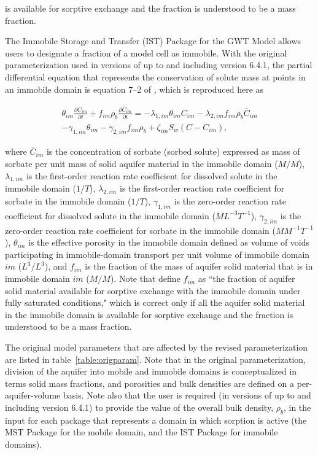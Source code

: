is available for sorptive exchange and the fraction is understood to be a mass fraction.

The Immobile Storage and Transfer (IST) Package for the GWT Model allows users to designate a fraction of a model cell as immobile. With the original parameterization used in versions of \mf up to and including version 6.4.1, the partial differential equation that represents the conservation of solute mass at points in an immobile domain is equation 7--2 of \cite{modflow6gwt}, which is reproduced here as 

\begin{equation}
\label{eqn:gwtistpdeorig}
\begin{split}
\theta_{im} \frac{\partial C_{im} }{\partial t} + f_{im} \rho_b \frac{\partial \overline{C}_{im}}{\partial t} = 
- \lambda_{1,im} \theta_{im} C_{im} - \lambda_{2,im}  f_{im} \rho_b \overline{C}_{im} \\
- \gamma_{1,im} \theta_{im} - \gamma_{2,im} f_{im}  \rho_b 
+ \zeta_{im} S_w \left ( C - C_{im} \right ),
\end{split}
\end{equation}

\noindent where $\overline{C}_{im}$ is the concentration of sorbate (sorbed solute) expressed as mass of sorbate per unit mass of solid aquifer material in the immobile domain ($M/M$), $\lambda_{1,im}$ is the first-order reaction rate coefficient for dissolved solute in the immobile domain ($1/T$), $\lambda_{2,im}$ is the first-order reaction rate coefficient for sorbate in the immobile domain ($1/T$), $\gamma_{1,im}$ is the zero-order reaction rate coefficient for dissolved solute in the immobile domain ($ML^{-3}T^{-1}$), $\gamma_{2,im}$ is the zero-order reaction rate coefficient for sorbate in the immobile domain ($M M^{-1}T^{-1}$), $\theta_{im}$ is the effective porosity in the immobile domain defined as volume of voids participating in immobile-domain transport per unit volume of immobile domain $im$ ($L^3/L^3$), and $f_{im}$ is the fraction of the mass of aquifer solid material that is in immobile domain $im$ ($M/M$). Note that \cite{modflow6gwt} define $f_{im}$ as ``the fraction of aquifer solid material available for sorptive exchange with the immobile domain under fully saturated conditions," which is correct only if all the aquifer solid material in the immobile domain is available for sorptive exchange and the fraction is understood to be a mass fraction.

The original model parameters that are affected by the revised parameterization are listed in table~\ref{table:origparam}. Note that in the original parameterization, division of the aquifer into mobile and immobile domains is conceptualized in terms solid mass fractions, and porosities and bulk densities are defined on a per-aquifer-volume basis. Note also that the user is required (in versions of \mf up to and including version 6.4.1) to provide the value of the overall bulk density, $\rho_b$, in the input for each package that represents a domain in which sorption is active (the MST Package for the mobile domain, and the IST Package for immobile domains).

